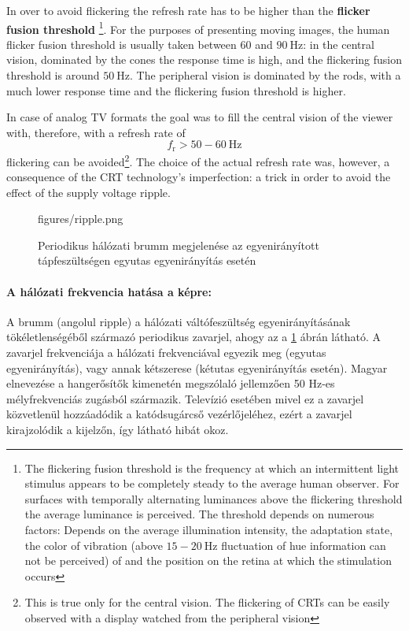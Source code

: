 In over to avoid flickering the refresh rate has to be higher than the \textbf{flicker fusion threshold}
\footnote{
The flickering fusion threshold is the frequency at which an intermittent light stimulus appears to be completely steady to the average human observer.
For surfaces with temporally alternating luminances above the flickering threshold the average luminance is perceived.
The threshold depends on numerous factors:
Depends on the average illumination intensity, the adaptation state, the color of vibration (above $15-20~\mathrm{Hz}$ fluctuation of hue information can not be perceived) of and the position on the retina at which the stimulation occurs}.
For the purposes of presenting moving images, the human flicker fusion threshold is usually taken between 60 and $90~\mathrm{Hz}$:
in the central vision, dominated by the cones the response time is high, and the flickering fusion threshold is around $50~\mathrm{Hz}$.
The peripheral vision is dominated by the rods, with a much lower response time and the flickering fusion threshold is higher.

In case of analog TV formats the goal was to fill the central vision of the viewer with, therefore, with a refresh rate of
\begin{equation}
f_{\mathrm{r}} > 50-60~\mathrm{Hz} 
\end{equation}
flickering can be avoided\footnote{This is true only for the central vision.
The flickering of CRTs can be easily observed with a display watched from the peripheral vision}.
The choice of the actual refresh rate was, however, a consequence of the CRT technology's imperfection: a trick in order to avoid the effect of the supply voltage ripple.

\begin{figure}[]
	\centering
	\begin{overpic}[width = 1\columnwidth ]{figures/ripple.png}
	\end{overpic}
	\caption{Periodikus hálózati brumm megjelenése az egyenirányított tápfeszültségen egyutas egyenirányítás esetén}
	\label{Fig:ripple}
\end{figure}

\paragraph*{A hálózati frekvencia hatása a képre:}
A brumm (angolul ripple) a hálózati váltófeszültség egyenirányításának tökéletlenségéből származó periodikus zavarjel, ahogy az a \ref{Fig:ripple} ábrán látható.
A zavarjel frekvenciája a hálózati frekvenciával egyezik meg (egyutas egyenirányítás), vagy annak kétszerese (kétutas egyenirányítás esetén).
Magyar elnevezése a hangerősítők kimenetén megszólaló jellemzően 50 Hz-es mélyfrekvenciás zugásból származik.
Televízió esetében mivel ez a zavarjel közvetlenül hozzáadódik a katódsugárcső vezérlőjeléhez, ezért a zavarjel kirajzolódik a kijelzőn, így látható hibát okoz.

